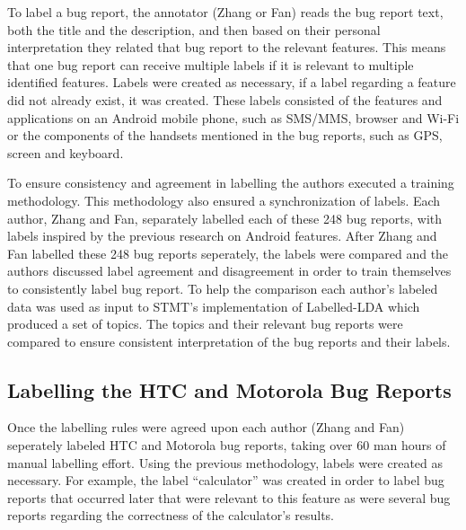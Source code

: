 \documentclass[10pt, conference, compsocconf]{IEEEtran}
\begin{document}
To label a bug report, the annotator (Zhang or Fan) reads the bug
report text, both the title and the description, and  then based on their
personal interpretation they related that bug report to the relevant
features. This means that one bug report can receive multiple labels
if it is relevant to multiple identified features. Labels were created
as necessary, if a label regarding a feature did not already exist, it
was created.
These labels 
consisted of the features and applications on an Android mobile
phone, such as SMS/MMS, browser and Wi-Fi or the components of the
handsets mentioned in the bug reports, such as GPS, screen and
keyboard.


To ensure consistency and agreement in labelling the authors executed a training
methodology. This methodology also ensured a synchronization of labels.
Each author, Zhang and Fan, separately labelled each of these 248 bug reports, 
with labels inspired by the previous research on Android
features. 
After Zhang and Fan labelled these 248 bug reports seperately, the
labels were compared and the authors discussed label agreement and
disagreement in order to train themselves to consistently label bug
report.
To help the comparison each author’s labeled data was used as input to
 STMT's implementation of Labelled-LDA which produced a set of topics.
The topics and their relevant bug reports were compared to ensure
consistent interpretation of the bug reports and their labels.





\subsection{Labelling the HTC and Motorola Bug Reports}

Once the labelling rules were agreed upon each author (Zhang and Fan)
seperately labeled HTC and Motorola bug reports, taking over 60 man
hours of manual labelling effort.
Using the previous methodology, labels were created as necessary.
For example, the label ``calculator'' was created in order to label
bug reports that occurred later that were relevant to this feature as
were several bug reports regarding the correctness of the
calculator's results. 
\end{document}
